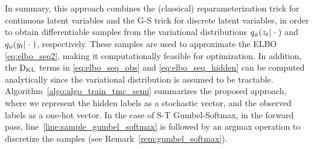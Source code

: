In summary, this approach combines the (classical)
reparameterization trick for continuous latent variables
and the G-S trick for discrete latent variables, in order
to obtain differentiable samples from the variational distributions
$q_\phi(z_{t}|\; \cdot \;)$ and $q_\phi(y_{t}|\; \cdot \;)$, respectively.
These samples are used to approximate the ELBO \eqref{eq:elbo_seq2}, 
making it computationally feasible for optimization. 
In addition, the $\mathrm{D}_{\mathrm{KL}}$ terms in \eqref{eq:elbo_seq_obs} and \eqref{eq:elbo_seq_hidden}
can be computed analytically since the variational distribution is assumed to be tractable.
Algorithm~\ref{algo:algo_train_tmc_semi} summarizes the proposed approach, 
where we represent the hidden labels as a 
stochastic vector, and the observed labels as a one-hot vector.
In the case of S-T Gumbel-Softmax, in the forward pass,
 line~\ref{line:sample_gumbel_softmax}
is followed by an argmax operation to discretize the samples
 (see Remark~\ref{rem:gumbel_softmax}).


